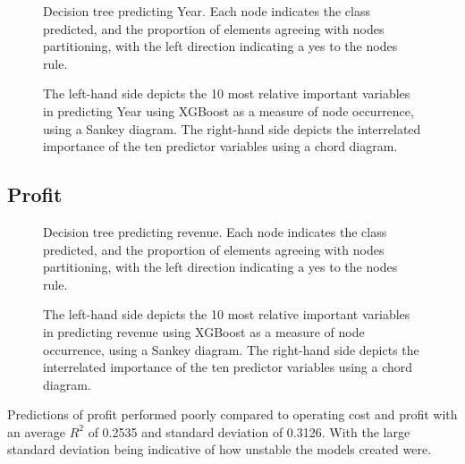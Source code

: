\documentclass[review,12pt,authoryear]{elsarticle}
\begin{document}
\begin{linenumbers}
 \begin{figure}[htb]
  \caption{Decision tree predicting Year. Each node indicates the class predicted, and the proportion of elements agreeing with nodes partitioning, with the left direction indicating a yes to the nodes rule.}\label{fig:year_tree}
 \end{figure}
 
\begin{figure}[htb]
  \caption{The left-hand side depicts the 10 most relative important variables in predicting Year using XGBoost as a measure of node occurrence, using a Sankey diagram. The right-hand side depicts the interrelated importance of the ten predictor variables using a chord diagram.}\label{fig:year_sankey}
 \end{figure}

\subsection{Profit}

 \begin{figure}[htb]
  \caption{Decision tree predicting revenue. Each node indicates the class predicted, and the proportion of elements agreeing with nodes partitioning, with the left direction indicating a yes to the nodes rule.}\label{fig:revenue_tree}
 \end{figure}
 
\begin{figure}[htb]
  \caption{The left-hand side depicts the 10 most relative important variables in predicting revenue using XGBoost as a measure of node occurrence, using a Sankey diagram. The right-hand side depicts the interrelated importance of the ten predictor variables using a chord diagram.}\label{fig:profit}
 \end{figure}

Predictions of profit performed poorly compared to operating cost and profit with an average $R^2$ of 0.2535 and standard deviation of 0.3126. With the large standard deviation being indicative of how unstable the models created were.

\end{linenumbers}
 
\end{document}
